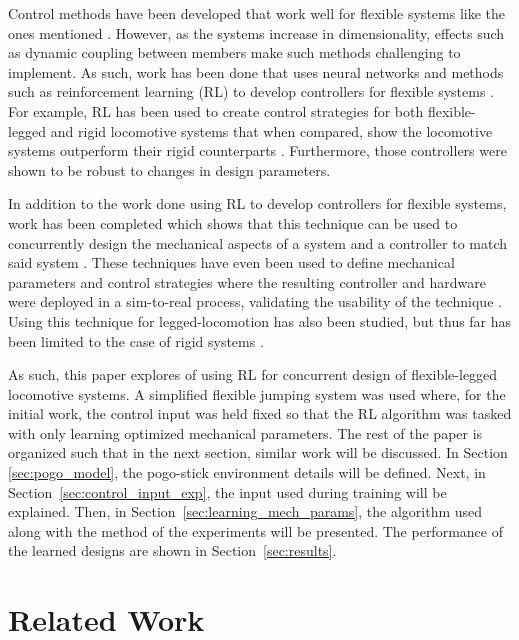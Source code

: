 \documentclass[letterpaper, 10 pt, conference]{ieeeconf}  %
\begin{document}
Control methods have been developed that work well for flexible systems like the ones mentioned \cite{Luo1993, Modeling2003}. However, as the systems increase in dimensionality, effects such as dynamic coupling between members make such methods challenging to implement. As such, work has been done that uses neural networks and methods such as reinforcement learning (RL) to develop controllers for flexible systems \cite{Bhagat2019e, Thuruthelb}. For example, RL has been used to create control strategies for both flexible-legged and rigid locomotive systems that when compared, show the locomotive systems outperform their rigid counterparts \cite{Dwiel2019d}. Furthermore, those controllers were shown to be robust to changes in design parameters. 

In addition to the work done using RL to develop controllers for flexible systems, work has been completed which shows that this technique can be used to concurrently design the mechanical aspects of a system and a controller to match said system \cite{Ha2019j}. These techniques have even been used to define mechanical parameters and control strategies where the resulting controller and hardware were deployed in a sim-to-real process, validating the usability of the technique \cite{Chen2020}. Using this technique for legged-locomotion has also been studied, but thus far has been limited to the case of rigid systems \cite{Schaff2019e}. 

As such, this paper explores of using RL for concurrent design of flexible-legged locomotive systems. A simplified flexible jumping system was used where, for the initial work, the control input was held fixed so that the RL algorithm was tasked with only learning optimized mechanical parameters. The rest of the paper is organized such that in the next section, similar work will be discussed. In Section \ref{sec:pogo_model}, the pogo-stick environment details will be defined. Next, in Section~\ref{sec:control_input_exp}, the input used during training will be explained. Then, in Section~\ref{sec:learning_mech_params}, the algorithm used along with the method of the experiments will be presented. The performance of the learned designs are shown in Section~\ref{sec:results}. %

\section{Related Work}
\label{sec:related_work}
\end{document}
